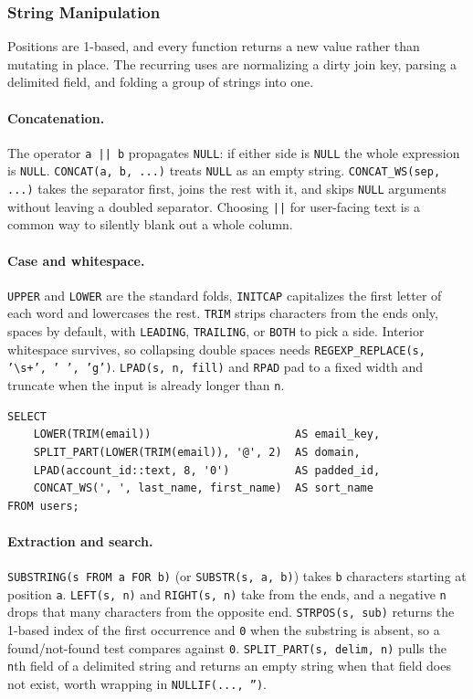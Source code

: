 \subsubsection{String Manipulation}

Positions are 1-based, and every function returns a new value rather than
mutating in place. The recurring uses are normalizing a dirty join key, parsing
a delimited field, and folding a group of strings into one.

\paragraph{Concatenation.} The operator \texttt{a || b} propagates
\texttt{NULL}: if either side is \texttt{NULL} the whole expression is
\texttt{NULL}. \texttt{CONCAT(a, b, ...)} treats \texttt{NULL} as an empty
string. \texttt{CONCAT\_WS(sep, ...)} takes the separator first, joins the rest
with it, and skips \texttt{NULL} arguments without leaving a doubled separator.
Choosing \texttt{||} for user-facing text is a common way to silently blank out
a whole column.

\paragraph{Case and whitespace.} \texttt{UPPER} and \texttt{LOWER} are the
standard folds, \texttt{INITCAP} capitalizes the first letter of each word and
lowercases the rest. \texttt{TRIM} strips characters from the ends only, spaces
by default, with \texttt{LEADING}, \texttt{TRAILING}, or \texttt{BOTH} to pick
a side. Interior whitespace survives, so collapsing double spaces needs
\texttt{REGEXP\_REPLACE(s, '\textbackslash s+', ' ', 'g')}.
\texttt{LPAD(s, n, fill)} and \texttt{RPAD} pad to a fixed width and truncate
when the input is already longer than \texttt{n}.

\vspace{2ex}

\begin{lstlisting}[style=sql, caption={Normalizing a join key}]
SELECT
    LOWER(TRIM(email))                      AS email_key,
    SPLIT_PART(LOWER(TRIM(email)), '@', 2)  AS domain,
    LPAD(account_id::text, 8, '0')          AS padded_id,
    CONCAT_WS(', ', last_name, first_name)  AS sort_name
FROM users;
\end{lstlisting}

\newpage

\paragraph{Extraction and search.} \texttt{SUBSTRING(s FROM a FOR b)} (or
\texttt{SUBSTR(s, a, b)}) takes \texttt{b} characters starting at position
\texttt{a}. \texttt{LEFT(s, n)} and \texttt{RIGHT(s, n)} take from the ends,
and a negative \texttt{n} drops that many characters from the opposite end.
\texttt{STRPOS(s, sub)} returns the 1-based index of the first occurrence and
\texttt{0} when the substring is absent, so a found/not-found test compares
against \texttt{0}. \texttt{SPLIT\_PART(s, delim, n)} pulls the \texttt{n}th
field of a delimited string and returns an empty string when that field does
not exist, worth wrapping in \texttt{NULLIF(..., '')}.

